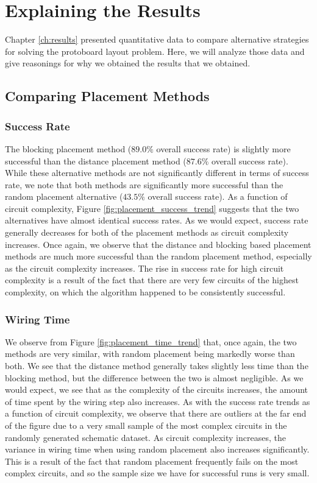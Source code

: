 \section{Explaining the Results}

Chapter \ref{ch:results} presented quantitative data to compare alternative
strategies for solving the protoboard layout problem. Here, we will
analyze those data and give reasonings for why we obtained the results
that we obtained.

\subsection{Comparing Placement Methods}

\subsubsection{Success Rate}
The blocking placement method ($89.0\%$ overall success rate)
is slightly more successful than the distance placement method ($87.6\%$ overall
success rate). While these alternative methods are not significantly different
in terms of success rate, we note that both methods are significantly
more successful than the random placement alternative ($43.5\%$ overall success
rate).
As a function of circuit
complexity, Figure
\ref{fig:placement_success_trend} suggests that the two alternatives have almost
identical success rates. As we would expect, success rate generally decreases
for both of the placement methods as circuit complexity increases.
Once again, we observe that the distance and blocking based placement methods
are much more successful than the random placement method, especially as the
circuit complexity increases.
The rise in success rate for high circuit complexity is a result of the fact
that there are very few circuits of the highest complexity, on which the
algorithm happened to be consistently successful.

\subsubsection{Wiring Time}
We observe from
Figure \ref{fig:placement_time_trend} that, once again, the two methods are
very similar, with random placement being markedly worse than both.
We see that the distance method generally takes slightly less
time than the blocking method, but the difference between the two is
almost negligible. As we would expect, we see that as the complexity
of the circuits increases, the amount of time spent by the wiring step also
increases. As with the success rate trends as a function of circuit
complexity, we observe that there are outliers at the far end of the figure due
to a very small sample of the most complex circuits in the randomly generated
schematic dataset. As circuit complexity increases, the variance in wiring time
when using random placement also increases significantly. This is a result of
the fact that random placement frequently fails on the most complex
circuits, and so the sample size we have for successful runs is very small.

